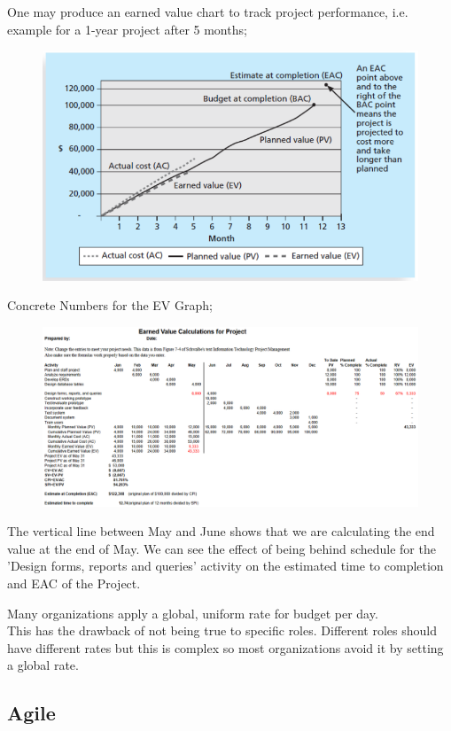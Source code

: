 \documentclass[]{project_plan}
\begin{document}
One may produce an earned value chart to track project performance, i.e. example for a 1-year project after 5 months;
\begin{figure}[H]
  \centering
  \includegraphics[width=.7\linewidth]{EVM chart.png}
\end{figure}

Concrete Numbers for the EV Graph;
\begin{figure}[H]
  \centering
  \includegraphics[width=\linewidth]{EVM chart calcs.png}
\end{figure}

The vertical line between May and June shows that we are calculating the end
value at the end of May. We can see the effect of being behind schedule for the
'Design forms, reports and queries' activity on the estimated time to
completion and EAC of the Project.

Many organizations apply a global, uniform rate for budget per day.\\
This has the drawback of not being true to specific roles. Different roles
should have different rates but this is complex so most organizations avoid it
by setting a global rate.

\subsection{Agile}
\end{document}
